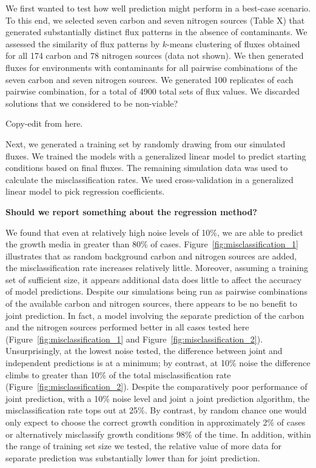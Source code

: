 \documentclass[12pt]{article}
\begin{document}
We first wanted to test how well prediction might perform in a best-case scenario. To this end, we selected seven carbon and seven nitrogen sources ({\color{red}Table X}) that generated substantially distinct flux patterns in the absence of contaminants. We assessed the similarity of flux patterns by $k$-means clustering of fluxes obtained for all 174 carbon and 78 nitrogen sources (data not shown). We then generated fluxes for environments with contaminants for all pairwise combinations of the seven carbon and seven nitrogen sources. We generated 100 replicates of each pairwise combination, for a total of 4900 total sets of flux values. {\color{red}We discarded solutions that we considered to be non-viable?} 

{\color{red}Copy-edit from here.}

Next, we generated a training set by randomly drawing from our simulated fluxes. We trained the models with a generalized linear model to predict starting conditions based on final fluxes. The remaining simulation data was used to calculate the misclassification rates. We used cross-validation in a generalized linear model to pick regression coefficients. 

\textbf{Should we report something about the regression method?}

We found that even at relatively high noise levels of 10\%, we are able to predict the growth media in greater than 80\% of cases. Figure~\ref{fig:misclassification_1} illustrates that as random background carbon and nitrogen sources are added, the misclassification rate increases relatively little. Moreover, assuming a training set of sufficient size, it appears additional data does little to affect the accuracy of model predictions. Despite our simulations being run as pairwise combinations of the available carbon and nitrogen sources, there appears to be no benefit to joint prediction. In fact, a model involving the separate prediction of the carbon and the nitrogen sources performed better in all cases tested here (Figure~\ref{fig:misclassification_1} and Figure~\ref{fig:misclassification_2}). Unsurprisingly, at the lowest noise tested, the difference between joint and independent predictions is at a minimum; by contrast, at 10\% noise the difference climbs to greater than 10\% of the total misclassification rate (Figure~\ref{fig:misclassification_2}). Despite the comparatively poor performance of joint prediction, with a 10\% noise level and joint a joint prediction algorithm, the misclassification rate tops out at 25\%. By contrast, by random chance one would only expect to choose the correct growth condition in approximately 2\% of cases or alternatively misclassify growth conditions 98\% of the time. In addition, within the range of training set size we tested, the relative value of more data for separate prediction was substantially lower than for joint prediction.
\end{document}
